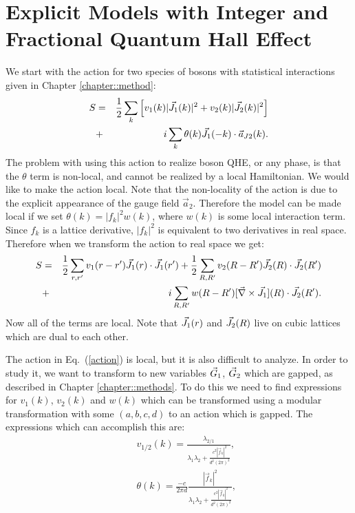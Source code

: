 \section{Explicit Models with Integer and Fractional Quantum Hall Effect}
\label{sec::demon} 

We start with the action for two species of bosons with statistical interactions given in Chapter \ref{chapter::method}:
\begin{eqnarray}
S&=&\frac{1}{2}\sum_k \left[v_1(k)|\vec{J}_1(k)|^2+v_2(k)|\vec{J}_2(k)|^2\right]\nonumber\\
&+&i\sum_k \theta(k)\vec{J}_1(-k)\cdot \vec{a}_{J2}(k).
\label{kaction_2_2}
\end{eqnarray}
The problem with using this action to realize boson QHE, or any phase, is that the $\theta$ term is non-local, and cannot be realized by a local Hamiltonian. We would like to make the action local. Note that the non-locality of the action is due to the explicit appearance of the gauge field $\vec{a}_2$. Therefore the model can be made local if we set $\theta(k)=|f_k|^2 w(k)$, where $w(k)$ is some local interaction term. Since $f_k$ is a lattice derivative, $|f_k|^2$ is equivalent to two derivatives in real space. Therefore when we transform the action to real space we get:
\begin{eqnarray}
S&=&\frac{1}{2} \sum_{r,r'} v_1(r-r')\vec{J}_1(r)\cdot\vec{J}_1(r')
+\frac{1}{2}\sum_{R,R'} v_2(R-R')\vec{J}_2(R)\cdot\vec{J}_2(R')\nonumber\\
&+&i\sum_{R,R'}  w(R-R')[\vec{\nabla}\times\vec{J}_1](R)\cdot\vec{J}_2(R').
\label{action}
\end{eqnarray}
Now all of the terms are local. Note that $\vec{J}_1(r)$ and $\vec{J}_2(R)$ live on cubic lattices which are dual to each other. 

The action in Eq.~(\ref{action}) is local, but it is also difficult to analyze. In order to study it, we want to transform to new variables $\vec{G}_1$, $\vec{G}_2$ which are gapped, as described in Chapter \ref{chapter::methods}. To do this we need to find expressions for $v_1(k)$, $v_2(k)$ and $w(k)$ which can be transformed using a modular transformation with some $(a,b,c,d)$ to an action which is gapped. The expressions which can accomplish this are: 
\begin{eqnarray}
&&v_{1/2}(k)=\frac{\lambda_{2/1}}{\lambda_1\lambda_2+\frac{c^2|\vec{f}_k|^2}{d^2(2\pi)^2}}, \label{vintro}\\
&&\theta(k)=\frac{-c}{2\pi d}\frac{|\vec{f}_k|^2}{\lambda_1\lambda_2+\frac{c^2|\vec{f}_k|^2}{d^2(2\pi)^2}},\label{tintro}
\end{eqnarray}

